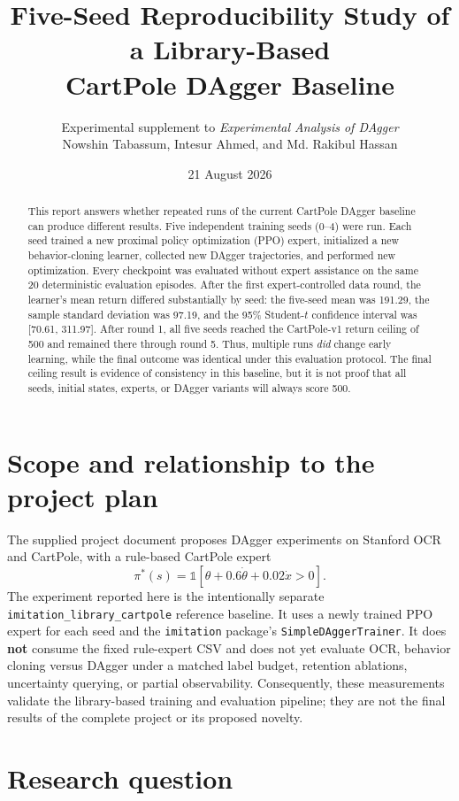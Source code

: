 \documentclass[11pt]{article}
\title{\textbf{Five-Seed Reproducibility Study of a Library-Based\\CartPole DAgger Baseline}}
\author{Experimental supplement to \emph{Experimental Analysis of DAgger}\\
Nowshin Tabassum, Intesur Ahmed, and Md. Rakibul Hassan}
\date{21 August 2026}
\begin{document}
\maketitle

\begin{abstract}
This report answers whether repeated runs of the current CartPole DAgger baseline can produce different results. Five independent training seeds (0--4) were run. Each seed trained a new proximal policy optimization (PPO) expert, initialized a new behavior-cloning learner, collected new DAgger trajectories, and performed new optimization. Every checkpoint was evaluated without expert assistance on the same 20 deterministic evaluation episodes. After the first expert-controlled data round, the learner's mean return differed substantially by seed: the five-seed mean was 191.29, the sample standard deviation was 97.19, and the 95\% Student-$t$ confidence interval was [70.61, 311.97]. After round 1, all five seeds reached the CartPole-v1 return ceiling of 500 and remained there through round 5. Thus, multiple runs \emph{did} change early learning, while the final outcome was identical under this evaluation protocol. The final ceiling result is evidence of consistency in this baseline, but it is not proof that all seeds, initial states, experts, or DAgger variants will always score 500.
\end{abstract}

\section{Scope and relationship to the project plan}

The supplied project document proposes DAgger experiments on Stanford OCR and CartPole, with a rule-based CartPole expert
\[
\pi^*(s)=\mathbb{1}\!\left[\theta+0.6\dot{\theta}+0.02\dot{x}>0\right].
\]
The experiment reported here is the intentionally separate \texttt{imitation\_library\_cartpole} reference baseline. It uses a newly trained PPO expert for each seed and the \texttt{imitation} package's \texttt{SimpleDAggerTrainer}. It does \textbf{not} consume the fixed rule-expert CSV and does not yet evaluate OCR, behavior cloning versus DAgger under a matched label budget, retention ablations, uncertainty querying, or partial observability. Consequently, these measurements validate the library-based training and evaluation pipeline; they are not the final results of the complete project or its proposed novelty.

\section{Research question}
\end{document}
